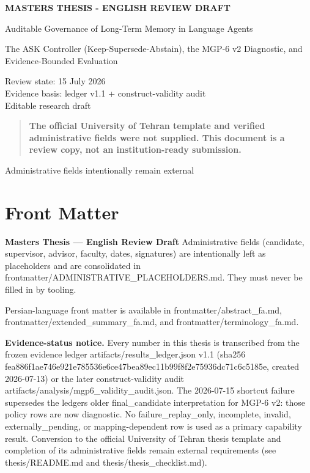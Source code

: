 \textbf{\textsc{MASTER\textquotesingle S THESIS - ENGLISH REVIEW DRAFT}}

Auditable Governance of Long-Term Memory in Language Agents

The ASK Controller (Keep-Supersede-Abstain), the MGP-6 v2 Diagnostic,
and Evidence-Bounded Evaluation

Review state: 15 July 2026\\
Evidence basis: ledger v1.1 + construct-validity audit\\
Editable research draft

\begin{quote}
\textbf{The official University of Tehran template and verified
administrative fields were not supplied. This document is a review copy,
not an institution-ready submission.}
\end{quote}

Administrative fields intentionally remain external

\section{Front Matter}\label{front-matter}

\textbf{Master\textquotesingle s Thesis --- English Review Draft}
Administrative fields (candidate, supervisor, advisor, faculty, dates,
signatures) are intentionally left as placeholders and are consolidated
in frontmatter/ADMINISTRATIVE\_PLACEHOLDERS.md. They must never be
filled in by tooling.

Persian-language front matter is available in
frontmatter/abstract\_fa.md, frontmatter/extended\_summary\_fa.md, and
frontmatter/terminology\_fa.md.

\textbf{Evidence-status notice.} Every number in this thesis is
transcribed from the frozen evidence ledger
artifacts/results\_ledger.json v1.1 (sha256
fea886f1ae746e921e785536e6ce47bea89ec11b99f8f2e75936dc71c6c5185e,
created 2026-07-13) or the later construct-validity audit
artifacts/analysis/mgp6\_validity\_audit.json. The 2026-07-15 shortcut
failure supersedes the ledger\textquotesingle s older final\_candidate
interpretation for MGP-6 v2: those policy rows are now diagnostic. No
failure\_replay\_only, incomplete, invalid, externally\_pending, or
mapping-dependent row is used as a primary capability result. Conversion
to the official University of Tehran thesis template and completion of
its administrative fields remain external requirements (see
thesis/README.md and thesis/thesis\_checklist.md).

